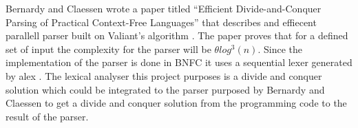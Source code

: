 Bernardy and Claessen \cite{bernardyefficient2013} wrote a paper titled 
``Efficient Divide-and-Conquer Parsing of Practical Context-Free Languages''
that describes and effiecent parallell parser built on Valiant's algorithm
\cite{valiantgeneral1975}. The paper proves that for a defined set of input
the complexity for the parser will be $\theta log^3(n)$.
Since the implementation of the parser is done in BNFC \cite{bnfc} it uses a
sequential lexer generated by alex \cite{alex}. The lexical analyser this
project purposes is a divide and conquer solution which could be integrated to
the parser purposed by Bernardy and Claessen to get a divide and conquer
solution from the programming code to the result of the parser.
